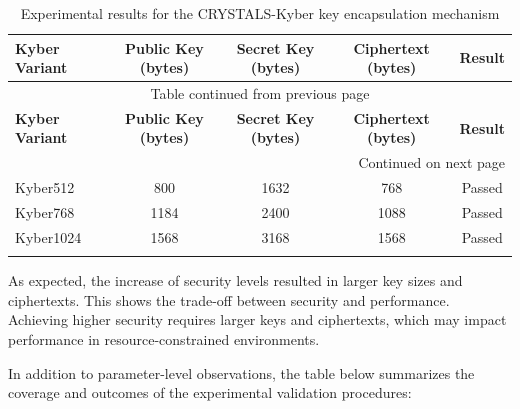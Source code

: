 \documentclass[12pt]{article}
\begin{document}
\begin{footnotesize}
\begin{longtable}{|l|c|c|c|c|}
\hline
\textbf{Kyber Variant} & \textbf{Public Key (bytes)} & \textbf{Secret Key (bytes)} & \textbf{Ciphertext (bytes)} & \textbf{Result} \\ \hline
\endfirsthead

\multicolumn{5}{c}{{Table \thetable{} continued from previous page}} \\ \hline
\textbf{Kyber Variant} & \textbf{Public Key (bytes)} & \textbf{Secret Key (bytes)} & \textbf{Ciphertext (bytes)} & \textbf{Result} \\ \hline
\endhead

\hline \multicolumn{5}{r}{{Continued on next page}} \\ \endfoot
\hline
\endlastfoot

Kyber512  & 800  & 1632 & 768  & Passed \\ \hline
Kyber768  & 1184 & 2400 & 1088 & Passed \\ \hline
Kyber1024 & 1568 & 3168 & 1568 & Passed \\ \hline

\caption{Experimental results for the CRYSTALS-Kyber key encapsulation mechanism}
\label{tab:kyber_results}
\end{longtable}
\end{footnotesize}

As expected, the increase of security levels resulted in larger key sizes and ciphertexts. This shows the trade-off between security and performance. Achieving higher security requires larger keys and ciphertexts, which may impact performance in resource-constrained environments.

In addition to parameter-level observations, the table below summarizes the coverage and outcomes of the experimental validation procedures:
\end{document}
